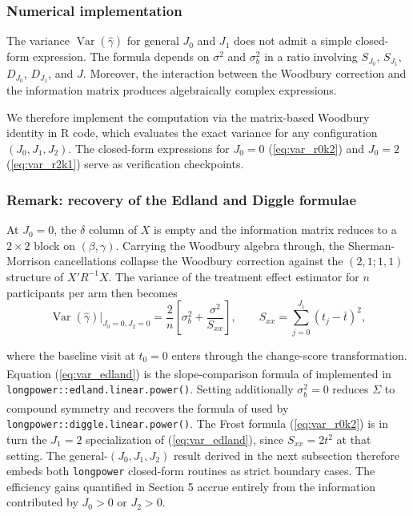 \documentclass[
  11pt,
]{article}
\begin{document}
\subsubsection{Numerical implementation}\label{numerical-implementation}

The variance \(\mathop{\mathrm{Var}}(\hat{\gamma})\) for general \(J_0\) and \(J_1\)
does not admit a simple closed-form expression. The formula
depends on \(\sigma^2\) and \(\sigma_b^2\) in a ratio involving
\(S_{J_0}\), \(S_{J_1}\), \(D_{J_0}\), \(D_{J_1}\), and \(J\). Moreover,
the interaction between the Woodbury correction and the
information matrix produces algebraically complex expressions.

We therefore implement the computation via the matrix-based
Woodbury identity in R code, which evaluates the exact
variance for any configuration \((J_0, J_1, J_2)\). The
closed-form expressions for \(J_0=0\) (\ref{eq:var_r0k2}) and
\(J_0=2\) (\ref{eq:var_r2k1}) serve as verification checkpoints.

\subsubsection{Remark: recovery of the Edland and Diggle formulae}\label{remark-recovery-of-the-edland-and-diggle-formulae}

At \(J_0 = 0\), the \(\delta\) column of \(X\) is empty and the
information matrix reduces to a \(2 \times 2\) block on
\((\beta, \gamma)\). Carrying the Woodbury algebra through, the
Sherman-Morrison cancellations collapse the Woodbury correction
against the \((2,1; 1,1)\) structure of \(X'R^{-1}X\). The variance
of the treatment effect estimator for \(n\) participants per arm
then becomes
\begin{equation}
  \mathop{\mathrm{Var}}(\hat{\gamma})\big|_{J_0=0,J_2=0}
  = \frac{2}{n}\!\left[\sigma_b^2 + \frac{\sigma^2}{S_{xx}}\right],
  \qquad
  S_{xx} = \sum_{j=0}^{J_1}(t_j - \bar t)^2,
  \label{eq:var_edland}
\end{equation}

where the baseline visit at \(t_0 = 0\) enters through the
change-score transformation. Equation (\ref{eq:var_edland}) is
the slope-comparison formula of\textsuperscript{}
implemented in \texttt{longpower::edland.linear.power()}. Setting
additionally \(\sigma_b^2 = 0\) reduces \(\Sigma\) to compound
symmetry and recovers the formula of\textsuperscript{}
used by \texttt{longpower::diggle.linear.power()}. The Frost formula
(\ref{eq:var_r0k2}) is in turn the \(J_1 = 2\) specialization of
(\ref{eq:var_edland}), since \(S_{xx} = 2t^2\) at that setting.
The general-\((J_0, J_1, J_2)\) result derived in the next
subsection therefore embeds both \texttt{longpower} closed-form
routines as strict boundary cases. The efficiency gains
quantified in Section 5 accrue entirely from the information
contributed by \(J_0 > 0\) or \(J_2 > 0\).
\end{document}
